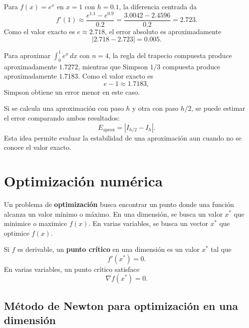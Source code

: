 \documentclass[a4,11pt]{aleph-notas}
\begin{document}
\begin{ejem}
    Para $f(x)=e^x$ en $x=1$ con $h=0.1$, la diferencia centrada da
    \[
        f'(1)\approx \frac{e^{1.1}-e^{0.9}}{0.2}
        =
        \frac{3.0042-2.4596}{0.2}
        =
        2.723.
    \]
    Como el valor exacto es $e\approx 2.718$, el error absoluto es aproximadamente
    \[
        |2.718-2.723|=0.005.
    \]
\end{ejem}

\begin{ejem}
    Para aproximar $\displaystyle\int_0^1 e^x\,dx$ con $n=4$, la regla del trapecio compuesta produce aproximadamente $1.7272$, mientras que Simpson $1/3$ compuesta produce aproximadamente $1.7183$. Como el valor exacto es
    \[
        e-1\approx 1.7183,
    \]
    Simpson obtiene un error menor en este caso.
\end{ejem}

\begin{defi}
    Si se calcula una aproximación con paso $h$ y otra con paso $h/2$, se puede estimar el error comparando ambos resultados:
    \[
        E_{\text{aprox}}=|I_{h/2}-I_h|.
    \]
    Esta idea permite evaluar la estabilidad de una aproximación aun cuando no se conoce el valor exacto.
\end{defi}


\section{Optimización numérica}

\begin{defi}
    Un problema de \textbf{optimización} busca encontrar un punto donde una función alcanza un valor mínimo o máximo. En una dimensión, se busca un valor $x^\ast$ que minimice o maximice $f(x)$. En varias variables, se busca un vector ${x}^\ast$ que optimice $f({x})$.
\end{defi}

\begin{defi}
    Si $f$ es derivable, un \textbf{punto crítico} en una dimensión es un valor $x^\ast$ tal que
    \[
        f'(x^\ast)=0.
    \]
    En varias variables, un punto crítico satisface
    \[
        \nabla f({x}^\ast)={0}.
    \]
\end{defi}

\subsection{Método de Newton para optimización en una dimensión}
\end{document}
